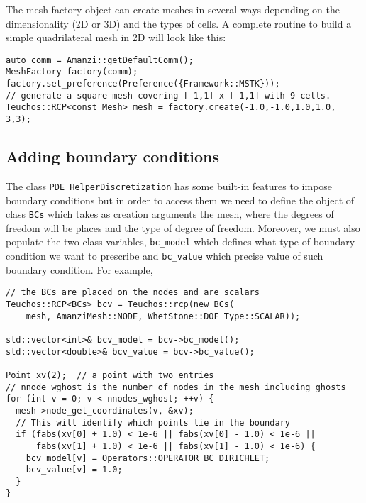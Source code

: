The mesh factory object can create meshes in several ways depending on the dimensionality (2D or 3D) and the types of cells. 
A complete routine to build a simple quadrilateral mesh in 2D will look like this: 
%
\begin{lstlisting}
auto comm = Amanzi::getDefaultComm();
MeshFactory factory(comm);
factory.set_preference(Preference({Framework::MSTK}));
// generate a square mesh covering [-1,1] x [-1,1] with 9 cells.
Teuchos::RCP<const Mesh> mesh = factory.create(-1.0,-1.0,1.0,1.0, 3,3);
\end{lstlisting}


\subsection{Adding boundary conditions}\label{Sec:AddingBoundaryCond}
The class {\tt PDE\_HelperDiscretization} has some built-in features to impose boundary conditions 
but in order to access them we need to define the object of class {\tt BCs} which takes as 
creation arguments the mesh, where the degrees of freedom will be places and the type of degree 
of freedom.
% 
Moreover, we must also populate the two class variables, {\tt bc\_model} which defines what 
type of boundary condition we want to prescribe and {\tt bc\_value} which precise value of such 
boundary condition.
%
For example,
%
\begin{lstlisting}
// the BCs are placed on the nodes and are scalars
Teuchos::RCP<BCs> bcv = Teuchos::rcp(new BCs(
    mesh, AmanziMesh::NODE, WhetStone::DOF_Type::SCALAR));

std::vector<int>& bcv_model = bcv->bc_model();
std::vector<double>& bcv_value = bcv->bc_value();

Point xv(2);  // a point with two entries
// nnode_wghost is the number of nodes in the mesh including ghosts
for (int v = 0; v < nnodes_wghost; ++v) {
  mesh->node_get_coordinates(v, &xv);
  // This will identify which points lie in the boundary
  if (fabs(xv[0] + 1.0) < 1e-6 || fabs(xv[0] - 1.0) < 1e-6 ||
      fabs(xv[1] + 1.0) < 1e-6 || fabs(xv[1] - 1.0) < 1e-6) {
    bcv_model[v] = Operators::OPERATOR_BC_DIRICHLET;
    bcv_value[v] = 1.0;
  }
}
\end{lstlisting}



